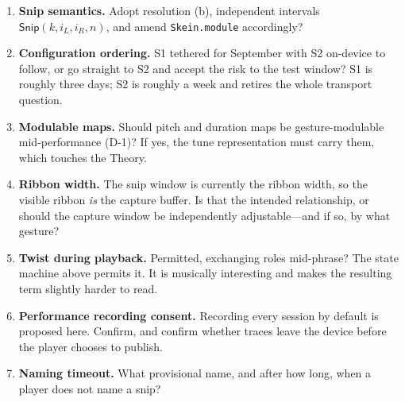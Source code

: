 \documentclass[11pt,a4paper]{article}
\theoremstyle{definition}
\theoremstyle{plain}
\theoremstyle{remark}
\begin{document}
\begin{enumerate}[leftmargin=*,itemsep=0.4em]
\item \textbf{Snip semantics.} Adopt resolution (b), independent intervals
      $\textsf{Snip}(k, i_L, i_R, n)$, and amend \texttt{Skein.module} accordingly?
\item \textbf{Configuration ordering.} S1 tethered for September with S2 on-device to follow, or go
      straight to S2 and accept the risk to the test window? S1 is roughly three days; S2 is
      roughly a week and retires the whole transport question.
\item \textbf{Modulable maps.} Should pitch and duration maps be gesture-modulable
      mid-performance (D-1)? If yes, the tune representation must carry them, which touches the
      Theory.
\item \textbf{Ribbon width.} The snip window is currently the ribbon width, so the visible ribbon
      \emph{is} the capture buffer. Is that the intended relationship, or should the capture window
      be independently adjustable---and if so, by what gesture?
\item \textbf{Twist during playback.} Permitted, exchanging roles mid-phrase? The state machine
      above permits it. It is musically interesting and makes the resulting term slightly harder to
      read.
\item \textbf{Performance recording consent.} Recording every session by default is proposed here.
      Confirm, and confirm whether traces leave the device before the player chooses to publish.
\item \textbf{Naming timeout.} What provisional name, and after how long, when a player does not
      name a snip?
\end{enumerate}
\end{document}
